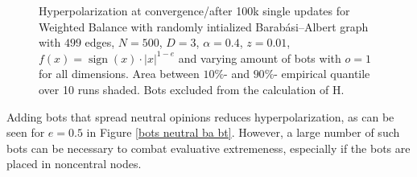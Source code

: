 \documentclass[11pt]{article}
\DeclareMathOperator{\sign}{sign}
\begin{document}
\begin{figure}[h!]
\caption{Hyperpolarization at convergence/after 100k single updates for Weighted Balance with randomly intialized Barabási–Albert graph with $499$ edges, $N=500$, $D=3$, $\alpha=0.4$, $z=0.01$, $f(x)=\sign(x)\cdot|x|^{1-e}$ and varying amount of bots with $o=1$ for all dimensions. Area between $10\%$- and $90\%$- empirical quantile over 10 runs shaded. Bots excluded from the calculation of H.}
\label{bots ba bt}
\end{figure}

Adding bots that spread neutral opinions reduces hyperpolarization, as can be seen for $e=0.5$ in Figure \ref{bots neutral ba bt}. However, a large number of such bots can be necessary to combat evaluative extremeness, especially if the bots are placed in noncentral nodes. 
\end{document}
